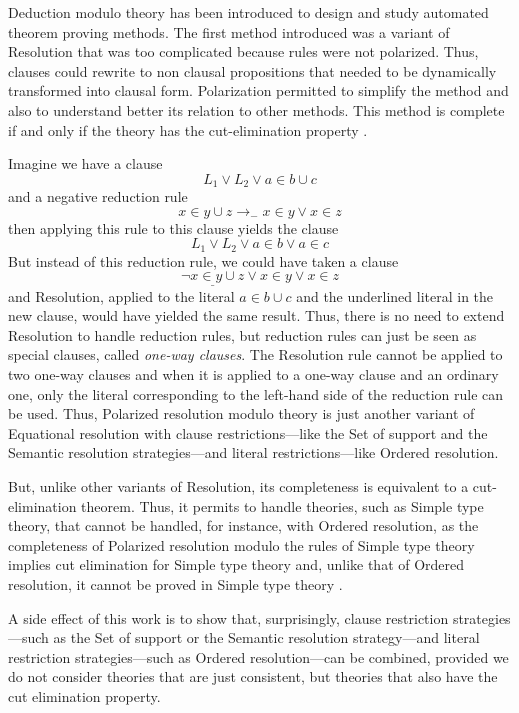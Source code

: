 \documentclass{llncs}
\newcommand{\lra}{\longrightarrow}
\begin{document}
Deduction modulo theory has been introduced to design and study
automated theorem proving methods. The first method introduced was a
variant of Resolution \cite{DHK} that was too complicated because rules
were not polarized. Thus, clauses could rewrite to non clausal
propositions that needed to be dynamically transformed into clausal form.
Polarization permitted to
simplify the method \cite{polar} and also to understand
better its relation to other methods. This method is complete if and only
if the theory has the cut-elimination property \cite{Hermant10}.

Imagine we have a clause $$L_1 \vee L_2 \vee a \in b \cup c$$
and a negative reduction rule 
$$x \in y \cup z \lra_- x \in y \vee x \in z$$
then applying this rule to this clause yields the clause
$$L_1 \vee L_2 \vee a \in b \vee a \in c$$
But instead of this reduction rule, we could have taken a clause 
$$\underline{\neg x \in y \cup z} \vee x \in y \vee x \in z$$ and
Resolution, applied to the literal $a \in b \cup c$ and the underlined
literal in the new clause, would have yielded the same result. Thus,
there is no need to extend Resolution to handle reduction rules, but
reduction rules can just be seen as special clauses, called {\em
  one-way clauses}. The Resolution rule cannot be applied to two
one-way clauses and when it is applied to a one-way clause and an
ordinary one, only the literal corresponding to the left-hand side of
the reduction rule can be used. Thus, Polarized resolution modulo
theory is just another variant of Equational resolution with clause
restrictions---like the Set of support \cite{Wos} and the Semantic
resolution \cite{Slagle} strategies---and literal restrictions---like
Ordered resolution.

But, unlike other variants of Resolution, its completeness is
equivalent to a cut-elimination theorem. Thus, it permits to handle
theories, such as Simple type theory, that cannot be handled, for
instance, with Ordered resolution, as the completeness of Polarized
resolution modulo the rules of Simple type theory implies cut
elimination for Simple type theory and, unlike that of Ordered
resolution, it cannot be proved in Simple type theory
\cite{BurelDowek}.

A side effect of this work is to show that, surprisingly, clause
restriction strategies---such as the Set of support or the Semantic
resolution strategy---and literal restriction strategies---such as
Ordered resolution---can be combined, provided we do not consider
theories that are just consistent, but theories that also have the cut
elimination property.
\end{document}
